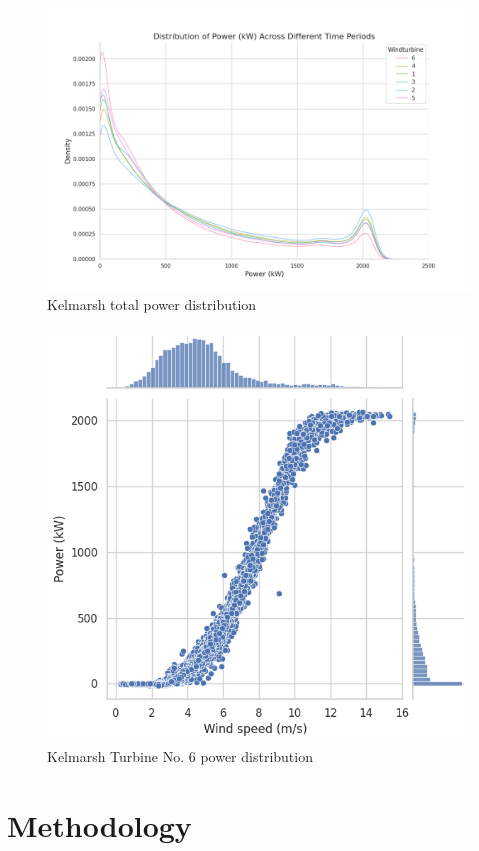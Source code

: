 \documentclass{article}
\begin{document}
\begin{figure}[h!]
    \centering
    \includegraphics[width=\linewidth]{graphs/data/Kelmarsh_output_distribution.png}
    \caption{Kelmarsh total power distribution}
    \label{fig:Kelmarsh-total-distribution}
\end{figure}

\begin{figure}[h!]
    \centering
    \includegraphics[width=.6\linewidth]{graphs/data/Corr_Wind_Power.png}
    \caption{Kelmarsh Turbine No. 6 power distribution}
    \label{fig:Kelmarsh-6-distribution}
\end{figure}


\section{Methodology}
\end{document}
